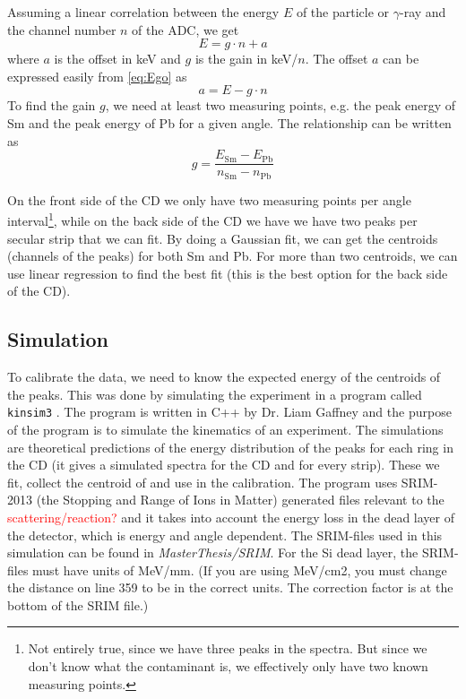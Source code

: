 \documentclass[twoside,english]{uiofysmaster/uiofysmaster}
\newcommand{\ga}{$\gamma$}
\begin{document}
Assuming a linear correlation between the energy $E$ of the particle or \ga-ray and the channel number $n$ of the ADC, we get
\begin{equation}\label{eq:Ego}
	E = g \cdot n + a
\end{equation}
where $a$ is the offset in keV and $g$ is the gain in keV/$n$. 
The offset $a$ can be expressed easily from \autoref{eq:Ego} as 
\begin{equation}\label{eq:offset}
	a = E - g \cdot n 
\end{equation}
To find the gain $g$, we need at least two measuring points, e.g. the peak energy of Sm and the peak energy of Pb for a given angle. 
The relationship can be written as 
\begin{equation}\label{eq:gain}
	g = \frac{E_{\text{Sm}} - E_{\text{Pb}}}{n_{\text{Sm}} - n_{\text{Pb}}}
\end{equation}

On the front side of the CD we only have two measuring points per angle interval\footnote{Not entirely true, since we have three peaks in the spectra. But since we don't know what the contaminant is, we effectively only have two known measuring points.}, while on the back side of the CD we have we have two peaks per secular strip that we can fit. 
By doing a Gaussian fit, we can get the centroids (channels of the peaks) for both Sm and Pb. 
For more than two centroids, we can use linear regression to find the best fit (this is the best option for the back side of the CD).



\subsection{Simulation}
To calibrate the data, we need to know the expected energy of the centroids of the peaks. 
This was done by simulating the experiment in a program called \texttt{kinsim3} \cite{kinsim}. 
The program is written in C++ by Dr. Liam Gaffney and the purpose of the program is to simulate the kinematics of an experiment. 
The simulations are theoretical predictions of the energy distribution of the peaks for each ring in the CD (it gives a simulated spectra for the CD and for every strip).
These we fit, collect the centroid of and use in the calibration.
The program uses SRIM-2013 \cite{SRIM} (the Stopping and Range of Ions in Matter) generated files relevant to the \textcolor{red}{scattering/reaction?} and it takes into account the energy loss in the dead layer of the detector, which is energy and angle dependent. 
The SRIM-files used in this simulation can be found in \textit{MasterThesis/SRIM}.
For the Si dead layer, the SRIM-files must have units of MeV/mm. 
(If you are using MeV/cm2, you must change the distance on line 359 to be in the correct units. 
The correction factor is at the bottom of the SRIM file.)
\end{document}
